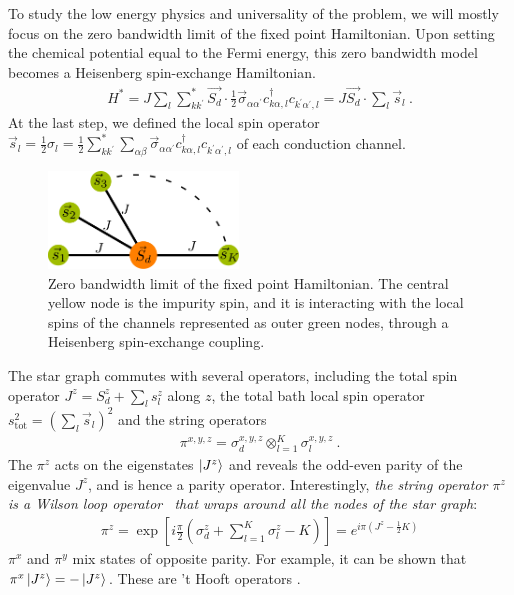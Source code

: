 \documentclass[reprint,prb,superscriptaddress]{revtex4-2}
\begin{document}
To study the low energy physics and universality of the problem, we will mostly focus on the zero bandwidth limit of the fixed point Hamiltonian. Upon setting the chemical potential equal to the Fermi energy, this zero bandwidth model becomes a Heisenberg spin-exchange Hamiltonian.
\begin{equation}\begin{aligned}
	\label{stargraph}
	H^* = J\sum_l\sum_{kk^\prime}^* \vec{S_d}\cdot\frac{1}{2}\vec{\sigma}_{\alpha\alpha^\prime}c_{k\alpha,l}^\dagger c_{k^\prime\alpha^\prime, l} = J\vec{S_d}\cdot\sum_l \vec{s}_l~.
\end{aligned}\end{equation}
At the last step, we defined the local spin operator \(\vec{s}_l = \frac{1}{2}\sigma_l = \frac{1}{2}\sum_{kk^\prime}^*\sum_{\alpha\beta}\vec{\sigma}_{\alpha\alpha^\prime}c_{k\alpha,l}^\dagger c_{k^\prime\alpha^\prime, l}\) of each conduction channel.
\begin{figure}[!htpb]
	\centering
	\includegraphics[width=0.45\textwidth]{./stargraph.pdf}
	\caption{Zero bandwidth limit of the fixed point Hamiltonian. The central yellow node is the impurity spin, and it is interacting with the local spins of the channels represented as outer green nodes, through a Heisenberg spin-exchange coupling.}
	\label{stargraph_fig}
\end{figure}
The star graph commutes with several operators, including the total spin operator \(J^z = S_d^z + \sum_l s_l^z\) along \(z\), the total bath local spin operator \(s^2_\text{tot} = \left(\sum_l \vec s_l\right)^2\) and the string operators 
\begin{equation}\begin{aligned}
\pi^{x,y,z} = \sigma_d^{x,y,z} \otimes_{l=1}^K \sigma_l^{x,y,z}~.
\end{aligned}\end{equation}
The \(\pi^z\) acts on the eigenstates \(\ket{J^z}\) and reveals the odd-even parity of the eigenvalue \(J^z\), and is hence a parity operator. Interestingly, \textit{the string operator \(\pi^z\) is a Wilson loop operator~\cite{fradkin2013field} that wraps around all the nodes of the star graph}:
\begin{equation}\begin{aligned}
	\label{w_loop}
	\pi^z = \exp\left[i \frac{\pi}{2} \left(\sigma_d^z + \sum_{l=1}^K \sigma^z_l - K\right)\right] = e^{i \pi \left(J^z - \frac{1}{2}K\right)}
\end{aligned}\end{equation}
\(\pi^x\) and \(\pi^y\) mix states of opposite parity. For example, it can be shown that \(\pi^x \ket{J^z} = -\ket{J^z}\). These are 't Hooft operators \cite{fradkin2013field}.
\end{document}
